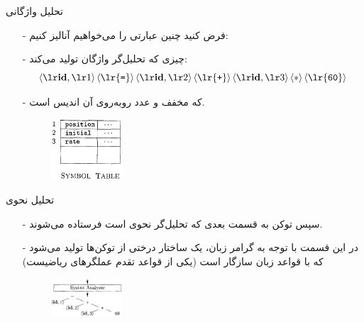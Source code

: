 \begin{frame}{تحلیل واژگانی }
\begin{itemize}\itemr
\item[-]
فرض کنید چنین عبارتی را می‌خواهیم آنالیز کنیم:

\begin{flushleft}
\end{flushleft}
\item[-]
چیزی که تحلیل‌گر واژگان تولید می‌کند:
\begin{equation*}
\token{1} 
\left\langle\text{\lr{\texttt{=}}}\right\rangle
\token{2}
\left\langle\text{\lr{\texttt{+}}}\right\rangle
\token{3}
\left\langle\ast\right\rangle
\left\langle\text{\lr{\texttt{60}}}\right\rangle
\end{equation*}

\item[-]
که 
مخفف 
و عدد روبه‌روی آن اندیس 
است.
\begin{figure}[H]
\begin{center}
\includegraphics[width=0.25\textwidth, height=0.3\textheight]{docs/images/symboltable}
\end{center}
\end{figure}
\end{itemize}
\end{frame}

\begin{frame}{تحلیل نحوی }
\begin{itemize}\itemr
\item[-]
سپس توکن به قسمت بعدی که تحلیل‌گر نحوی است فرستاده می‌شوند.

\item[-]
در این قسمت با توجه به گرامر زبان، یک ساختار درختی از توکن‌ها تولید می‌شود که با قواعد زبان سازگار است (یکی از قواعد تقدم عملگرهای ریاضیست)

\begin{figure}[H]
\begin{center}
\includegraphics[width=0.25\textwidth, height=0.31\textheight]{docs/images/syntax}
\end{center}
\end{figure}
\end{itemize}
\end{frame}

